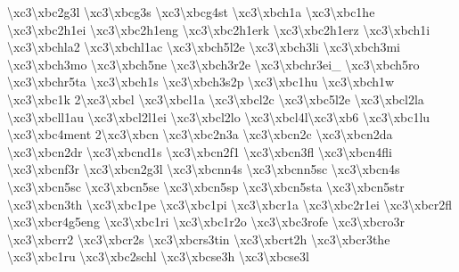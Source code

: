 {\textbackslash{}xc3\textbackslash{}xbc2g3l \textbackslash{}xc3\textbackslash{}xbcg3s \textbackslash{}xc3\textbackslash{}xbcg4st \textbackslash{}xc3\textbackslash{}xbch1a \textbackslash{}xc3\textbackslash{}xbc1he \textbackslash{}xc3\textbackslash{}xbc2h1ei \textbackslash{}xc3\textbackslash{}xbc2h1eng \textbackslash{}xc3\textbackslash{}xbc2h1erk \textbackslash{}xc3\textbackslash{}xbc2h1erz \textbackslash{}xc3\textbackslash{}xbch1i \textbackslash{}xc3\textbackslash{}xbchla2 \textbackslash{}xc3\textbackslash{}xbchl1ac \textbackslash{}xc3\textbackslash{}xbch5l2e \textbackslash{}xc3\textbackslash{}xbch3li \textbackslash{}xc3\textbackslash{}xbch3mi \textbackslash{}xc3\textbackslash{}xbch3mo \textbackslash{}xc3\textbackslash{}xbch5ne \textbackslash{}xc3\textbackslash{}xbch3r2e \textbackslash{}xc3\textbackslash{}xbchr3ei\-\_\- \textbackslash{}xc3\textbackslash{}xbch5ro \textbackslash{}xc3\textbackslash{}xbchr5ta \textbackslash{}xc3\textbackslash{}xbch1s \textbackslash{}xc3\textbackslash{}xbch3s2p \textbackslash{}xc3\textbackslash{}xbc1hu \textbackslash{}xc3\textbackslash{}xbch1w \textbackslash{}xc3\textbackslash{}xbc1k 2\textbackslash{}xc3\textbackslash{}xbcl \textbackslash{}xc3\textbackslash{}xbcl1a \textbackslash{}xc3\textbackslash{}xbcl2c \textbackslash{}xc3\textbackslash{}xbc5l2e \textbackslash{}xc3\textbackslash{}xbcl2la \textbackslash{}xc3\textbackslash{}xbcll1au \textbackslash{}xc3\textbackslash{}xbcl2l1ei \textbackslash{}xc3\textbackslash{}xbcl2lo \textbackslash{}xc3\textbackslash{}xbcl4l\textbackslash{}xc3\textbackslash{}xb6 \textbackslash{}xc3\textbackslash{}xbc1lu \textbackslash{}xc3\textbackslash{}xbc4ment 2\textbackslash{}xc3\textbackslash{}xbcn \textbackslash{}xc3\textbackslash{}xbc2n3a \textbackslash{}xc3\textbackslash{}xbcn2c \textbackslash{}xc3\textbackslash{}xbcn2da \textbackslash{}xc3\textbackslash{}xbcn2dr \textbackslash{}xc3\textbackslash{}xbcnd1s \textbackslash{}xc3\textbackslash{}xbcn2f1 \textbackslash{}xc3\textbackslash{}xbcn3fl \textbackslash{}xc3\textbackslash{}xbcn4fli \textbackslash{}xc3\textbackslash{}xbcnf3r \textbackslash{}xc3\textbackslash{}xbcn2g3l \textbackslash{}xc3\textbackslash{}xbcnn4s \textbackslash{}xc3\textbackslash{}xbcnn5sc \textbackslash{}xc3\textbackslash{}xbcn4s \textbackslash{}xc3\textbackslash{}xbcn5sc \textbackslash{}xc3\textbackslash{}xbcn5se \textbackslash{}xc3\textbackslash{}xbcn5sp \textbackslash{}xc3\textbackslash{}xbcn5sta \textbackslash{}xc3\textbackslash{}xbcn5str \textbackslash{}xc3\textbackslash{}xbcn3th \textbackslash{}xc3\textbackslash{}xbc1pe \textbackslash{}xc3\textbackslash{}xbc1pi \textbackslash{}xc3\textbackslash{}xbcr1a \textbackslash{}xc3\textbackslash{}xbc2r1ei \textbackslash{}xc3\textbackslash{}xbcr2fl \textbackslash{}xc3\textbackslash{}xbcr4g5eng \textbackslash{}xc3\textbackslash{}xbc1ri \textbackslash{}xc3\textbackslash{}xbc1r2o \textbackslash{}xc3\textbackslash{}xbc3rofe \textbackslash{}xc3\textbackslash{}xbcro3r \textbackslash{}xc3\textbackslash{}xbcrr2 \textbackslash{}xc3\textbackslash{}xbcr2s \textbackslash{}xc3\textbackslash{}xbcrs3tin \textbackslash{}xc3\textbackslash{}xbcrt2h \textbackslash{}xc3\textbackslash{}xbcr3the \textbackslash{}xc3\textbackslash{}xbc1ru \textbackslash{}xc3\textbackslash{}xbc2schl \textbackslash{}xc3\textbackslash{}xbcse3h \textbackslash{}xc3\textbackslash{}xbcse3l }
